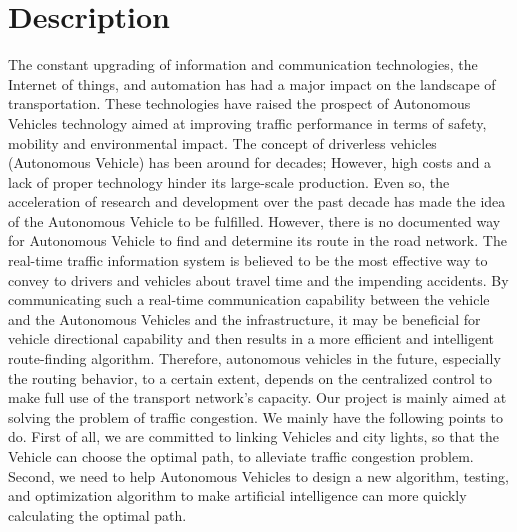 \documentclass[letterpaper,10pt,draftclsnofoot,onecolumn]{IEEEtran}
\begin{document}
\section{Description}
The constant upgrading of information and communication technologies, the Internet of things, and automation has had a major impact on the landscape of transportation. These technologies have raised the prospect of Autonomous Vehicles technology aimed at improving traffic performance in terms of safety, mobility and environmental impact. The concept of driverless vehicles (Autonomous Vehicle) has been around for decades; However, high costs and a lack of proper technology hinder its large-scale production. Even so, the acceleration of research and development over the past decade has made the idea of the Autonomous Vehicle to be fulfilled. However, there is no documented way for Autonomous Vehicle to find and determine its route in the road network. The real-time traffic information system is believed to be the most effective way to convey to drivers and vehicles about travel time and the impending accidents. By communicating such a real-time communication capability between the vehicle and the Autonomous Vehicles and the infrastructure, it may be beneficial for vehicle directional capability and then results in a more efficient and intelligent route-finding algorithm. Therefore, autonomous vehicles in the future, especially the routing behavior, to a certain extent, depends on the centralized control to make full use of the transport network's capacity. Our project is mainly aimed at solving the problem of traffic congestion. We mainly have the following points to do. First of all, we are committed to linking Vehicles and city lights, so that the Vehicle can choose the optimal path, to alleviate traffic congestion problem. Second, we need to help Autonomous Vehicles to design a new algorithm, testing, and optimization algorithm to make artificial intelligence can more quickly calculating the optimal path.
\end{document}
